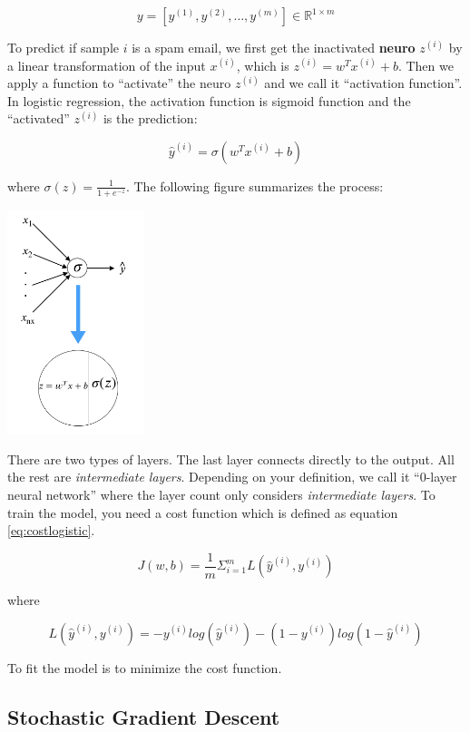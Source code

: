 \documentclass[12pt,]{krantz}
\begin{document}
\[y=[y^{(1)},y^{(2)},\dots,y^{(m)}] \in \mathbb{R}^{1 \times m}\]

To predict if sample \(i\) is a spam email, we first get the inactivated \textbf{neuro} \(z^{(i)}\) by a linear transformation of the input \(x^{(i)}\), which is \(z^{(i)}=w^Tx^{(i)} + b\). Then we apply a function to ``activate'' the neuro \(z^{(i)}\) and we call it ``activation function''. In logistic regression, the activation function is sigmoid function and the ``activated'' \(z^{(i)}\) is the prediction:

\[\hat{y}^{(i)} = \sigma(w^Tx^{(i)} + b)\]

where \(\sigma(z) = \frac{1}{1+e^{-z}}\). The following figure summarizes the process:

\includegraphics[width=0.3\textwidth,height=\textheight]{images/dnn0.png}

There are two types of layers. The last layer connects directly to the output. All the rest are \emph{intermediate layers}. Depending on your definition, we call it ``0-layer neural network'' where the layer count only considers \emph{intermediate layers}. To train the model, you need a cost function which is defined as equation \eqref{eq:costlogistic}.

\begin{equation}
J(w,b)=\frac{1}{m} \Sigma_{i=1}^m L(\hat{y}^{(i)}, y^{(i)})
\label{eq:costlogistic}
\end{equation}

where

\[L(\hat{y}^{(i)}, y^{(i)}) =  -y^{(i)}log(\hat{y}^{(i)})-(1-y^{(i)})log(1-\hat{y}^{(i)})\]

To fit the model is to minimize the cost function.

\hypertarget{stochastic-gradient-descent}{%
\subsection{Stochastic Gradient Descent}\label{stochastic-gradient-descent}}
\end{document}
